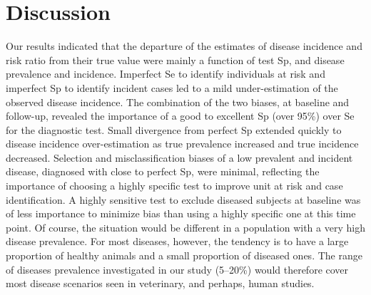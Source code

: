 \documentclass[utf8]{frontiersSCNS}\usepackage[]{graphicx}\usepackage[]{color}
\begin{document}
\section{Discussion}
\label{sec:discussion}

Our results indicated that the departure of the estimates of disease incidence
and risk ratio from their true value were mainly a function of test Sp, and
disease prevalence and incidence.
Imperfect Se to identify individuals at risk and imperfect Sp to identify
incident cases led to a mild under-estimation of the observed disease incidence.
The combination of the two biases, at baseline and follow-up, revealed the
importance of a good to excellent Sp (over 95\%) over Se for the diagnostic
test.
Small divergence from perfect Sp extended quickly to disease incidence
over-estimation as true prevalence increased and true incidence decreased.
Selection and misclassification biases of a low prevalent and incident
disease, diagnosed with close to perfect Sp, were minimal, reflecting the
importance of choosing a highly specific test to improve unit at risk and case
identification.
A highly sensitive test to exclude diseased subjects at baseline was of less
importance to minimize bias than using a highly specific one at this time point.
Of course, the situation would be different in a population with a very high
disease prevalence.
For most diseases, however, the tendency is to have a large proportion of
healthy animals and a small proportion of diseased ones.
The range of diseases prevalence investigated in our study (5--20\%) would
therefore cover most disease scenarios seen in veterinary, and perhaps, human
studies.
\end{document}
